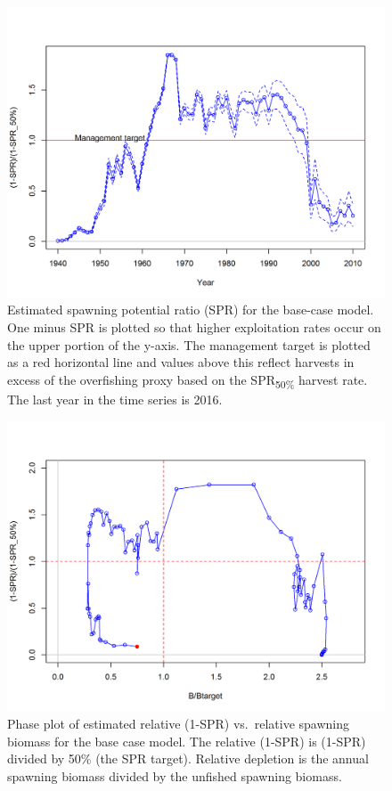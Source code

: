 \documentclass[12pt,]{article}
\begin{document}
\begin{figure}
\centering
\includegraphics{r4ss/plots_mod1/SPR3_ratiointerval.png}
\caption{Estimated spawning potential ratio (SPR) for the base-case
model. One minus SPR is plotted so that higher exploitation rates occur
on the upper portion of the y-axis. The management target is plotted as
a red horizontal line and values above this reflect harvests in excess
of the overfishing proxy based on the SPR\textsubscript{50\%} harvest
rate. The last year in the time series is 2016. \label{fig:SPR_all}}
\end{figure}

\begin{figure}
\centering
\includegraphics{r4ss/plots_mod1/SPR4_phase.png}
\caption{Phase plot of estimated relative (1-SPR) vs.~relative spawning
biomass for the base case model. The relative (1-SPR) is (1-SPR) divided
by 50\% (the SPR target). Relative depletion is the annual spawning
biomass divided by the unfished spawning biomass. \label{fig:Phase_all}}
\end{figure}
\end{document}
